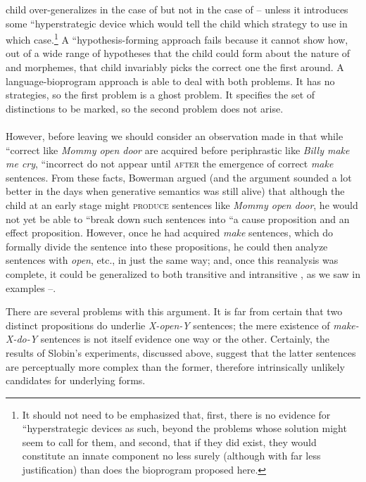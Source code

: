 child over-generalizes in the case of   but not in the case of   -- unless it introduces some ``hyperstrategic device which would tell the child which strategy to use in which case.\footnote{It should not need to be emphasized that, first, there is no evidence for ``hyperstrategic devices as such, beyond the problems whose solution might seem to call for them, and second, that if they did exist, they would constitute an innate component no less surely (although with far less justification) than does the bioprogram proposed here.} A ``hypothesis-forming approach fails because it cannot show how, out of a wide range of hypotheses that the child could form about the nature of  and  morphemes, that child invariably picks the correct one the first  around. A language-bioprogram approach is able to deal with both problems. It has no strategies, so the first problem is a ghost problem. It specifies the set of distinctions to be marked, so the second problem does not arise.\\\\

However, before leaving  we should consider an observation made in \citet{Bowerman1974} that while ``correct  like \textit{Mommy open door} are acquired before periphrastic  like \textit{Billy make me cry}, ``incorrect  do not appear until \textsc{after} the emergence of correct \textit{make} sentences. From these facts, Bowerman argued (and the argument sounded a lot better in the days when genera\-tive semantics was still alive) that although the child at an early stage might \textsc{produce} sentences like \textit{Mommy open door}, he would not yet be able to ``break down such sentences into ``a cause proposition and an effect proposition. However, once he had acquired \textit{make} sentences, which do formally divide the sentence into these proposi\-tions, he could then analyze sentences with \textit{open}, etc., in just the same way; and, once this reanalysis was complete, it could be generalized to both transitive and intransitive , as we saw in examples --.

There are several problems with this argument. It is far from certain that two distinct propositions do underlie \textit{X-open-Y} sentences; the mere existence of \textit{make-X-do-Y} sentences is not itself evidence one way or the other. Certainly, the results of Slobin's experiments, discussed above, suggest that the latter sentences are perceptually more complex than the former, therefore intrinsically unlikely candidates for underlying forms.

